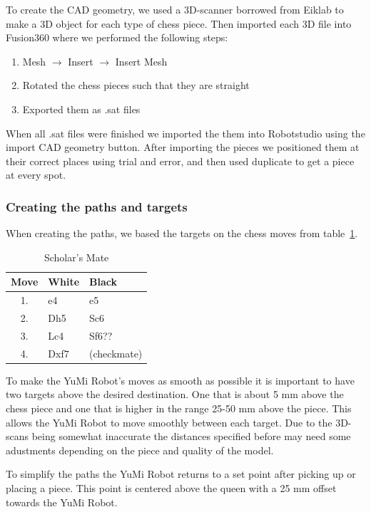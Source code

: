 \documentclass[a4paper,12pt]{article}
\begin{document}
To create the CAD geometry, we used a 3D-scanner borrowed from Eiklab to make a 3D object for each type of chess piece. Then imported each 3D file into Fusion360 where we performed the following steps:
\begin{enumerate}
    \item Mesh $\rightarrow$ Insert $\rightarrow$ Insert Mesh
    \item Rotated the chess pieces such that they are straight
    \item Exported them as .sat files
\end{enumerate}
When all .sat files were finished we imported the them into Robotstudio using the import CAD geometry button. After importing the pieces we positioned them at their correct places using trial and error, and then used duplicate to get a piece at every spot.

\subsubsection{Creating the paths and targets}
\label{sec:Challenge_paths_targets}
When creating the paths, we based the targets on the chess moves from table~\ref{tab:chess_moves}.

\begin{table}[h] %
    \centering
    \begin{tabular}{c l l}
        \hline
        Move & White & Black \\
        \hline
        1. & e4 & e5 \\
        2. & Dh5 & Sc6 \\
        3. & Lc4 & Sf6?? \\
        4. & Dxf7 & (checkmate) \\
        \hline
    \end{tabular}
    \caption{Scholar's Mate}
    \label{tab:chess_moves}
\end{table}
To make the YuMi Robot's moves as smooth as possible it is important to have two targets above the desired destination. One that is about 5 mm above the chess piece and one that is higher in the range 25-50 mm above the piece. This allows the YuMi Robot to move smoothly between each target. Due to the 3D-scans being somewhat inaccurate the distances specified before may need some adustments depending on the piece and quality of the model.

To simplify the paths the YuMi Robot returns to a set point after picking up or placing a piece. This point is centered above the queen with a 25 mm offset towards the YuMi Robot. 
\end{document}
